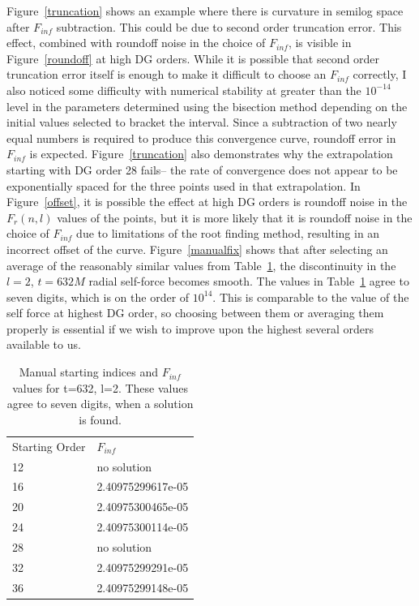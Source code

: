 Figure~\ref{truncation} shows an example where there is curvature in semilog space after $F_{inf}$ subtraction. This could be due to second order truncation error. This effect, combined with roundoff noise in the choice of $F_{inf}$, is visible in Figure~\ref{roundoff} at high DG orders. While it is possible that second order truncation error itself is enough to make it difficult to choose an $F_{inf}$ correctly, I also noticed some difficulty with numerical stability at greater than the $10^{-14}$ level in the parameters determined using the bisection method depending on the initial values selected to bracket the interval. Since a subtraction of two nearly equal numbers is required to produce this convergence curve, roundoff error in $F_{inf}$ is expected. Figure~\ref{truncation} also demonstrates why the extrapolation starting with DG order 28 fails-- the rate of convergence does not appear to be exponentially spaced for the three points used in that extrapolation. In Figure~\ref{offset}, it is possible the effect at high DG orders is roundoff noise in the $F_r(n,l)$ values of the points, but it is more likely that it is roundoff noise in the choice of $F_{inf}$ due to limitations of the root finding method, resulting in an incorrect offset of the curve. Figure~\ref{manualfix} shows that after selecting an average of the reasonably similar values from Table~\ref{manual}, the discontinuity in the $l=2$, $t=632M$ radial self-force becomes smooth. The values in Table~\ref{manual} agree to seven digits, which is on the order of $10^{14}$. This is comparable to the value of the self force at highest DG order, so choosing between them or averaging them properly is essential if we wish to improve upon the highest several orders available to us. 


\begin{table}
  \begin{tabular}{ll}
    Starting Order & $F_{inf}$\\
    12 & no solution\\
    16 & 2.40975299617e-05\\
    20 & 2.40975300465e-05\\
    24 & 2.40975300114e-05\\
    28 & no solution\\
    32 & 2.40975299291e-05\\
    36 & 2.40975299148e-05\\
  \end{tabular}
  \caption{Manual starting indices and $F_{inf}$ values for t=632, l=2. These values agree to seven digits, when a solution is found.}
  \label{manual}
\end{table}

